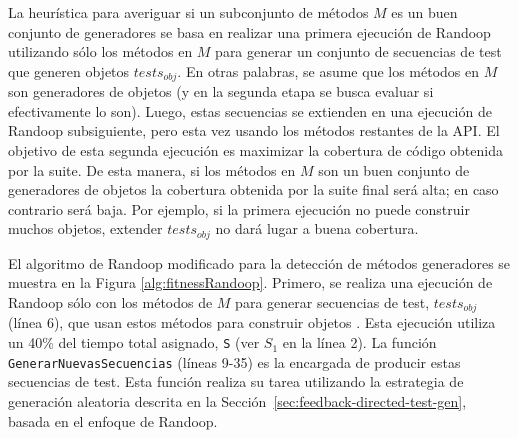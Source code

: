 La heurística para averiguar si un
subconjunto de métodos $M$ es un buen conjunto de generadores se basa en
realizar una primera ejecución de Randoop utilizando sólo los métodos en $M$ para
generar un conjunto de secuencias de test que generen objetos $tests_{obj}$. En
otras palabras, se asume que los métodos en $M$ son generadores de objetos (y
en la segunda etapa se busca evaluar si efectivamente lo son).
Luego, estas secuencias se extienden en una ejecución de Randoop subsiguiente,
pero esta vez usando los métodos restantes de la API. El objetivo de esta
segunda ejecución es maximizar la cobertura de código obtenida por la suite. 
De esta manera, si los métodos en $M$ son un buen conjunto de generadores de objetos
la cobertura obtenida por la suite final será alta; en caso contrario será baja. 
Por ejemplo, si la primera ejecución no puede construir muchos objetos, extender 
$tests_{obj}$ no dará lugar a buena cobertura.

El algoritmo de Randoop modificado para la detección de métodos generadores se muestra 
en la Figura \ref{alg:fitnessRandoop}.
Primero, se realiza una ejecución de Randoop sólo con los métodos de $M$ para
generar secuencias de test, $tests_{obj}$ (línea 6), que usan estos métodos para construir objetos . Esta ejecución utiliza un 40\% del tiempo total
asignado, \texttt{S} (ver $S_1$ en la línea 2). 
La función \texttt{GenerarNuevasSecuencias} (líneas 9-35) es la encargada de
producir estas secuencias de test. Esta función realiza su tarea utilizando 
la estrategia de generación aleatoria descrita en la Sección~\ref{sec:feedback-directed-test-gen}, basada en el enfoque de Randoop. 


